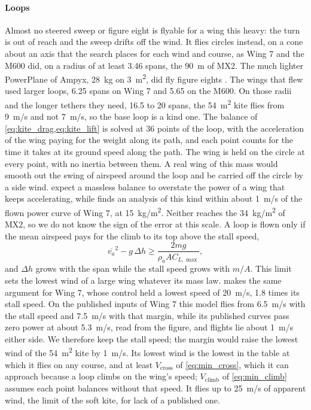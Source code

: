 \paragraph{Loops} Almost no steered sweep or figure eight is flyable for a wing this heavy: the turn is out of reach and the sweep drifts off the wind. It flies circles instead, on a cone about an axis that the search places for each wind and course, as Wing 7 and the M600 did, on a radius of at least 3.46 spans, the \SI{90}{m} of MX2. The much lighter PowerPlane of Ampyx, \SI{28}{kg} on \SI{3}{m^2}, did fly figure eights \citep{ruiterkamp2013}. The wings that flew used larger loops, 6.25 spans on Wing 7 \citep{vanderlind2013} and 5.65 on the M600. On those radii and the longer tethers they need, 16.5 to 20 spans, the \SI{54}{m^2} kite flies from \SI{9}{m/s} and not \SI{7}{m/s}, so the base loop is a kind one. The balance of \cref{eq:kite_drag,eq:kite_lift} is solved at 36 points of the loop, with the acceleration of the wing paying for the weight along its path, and each point counts for the time it takes at its ground speed along the path. The wing is held on the circle at every point, with no inertia between them. A real wing of this mass would smooth out the swing of airspeed around the loop and be carried off the circle by a side wind. \citet{ruiterkamp2013} expect a massless balance to overstate the power of a wing that keeps accelerating, while \citet{vanderlind2013} finds an analysis of this kind within about \SI{1}{m/s} of the flown power curve of Wing 7, at \SI{15}{kg/m^2}. Neither reaches the \SI{34}{kg/m^2} of MX2, so we do not know the sign of the error at this scale. A loop is flown only if the mean airspeed pays for the climb to its top above the stall speed,
\begin{equation}
\overline{v_a}^2 - g\,\Delta h \geq \frac{2mg}{\rho_a A C_{L,\max}},
\label{eq:loop_top}
\end{equation}
and $\Delta h$ grows with the span while the stall speed grows with $m/A$. This limit sets the lowest wind of a large wing whatever its mass law. \citet{vanderlind2013} makes the same argument for Wing 7, whose control held a lowest speed of \SI{20}{m/s}, 1.8 times its stall speed. On the published inputs of Wing 7 this model flies from \SI{6.5}{m/s} with the stall speed and \SI{7.5}{m/s} with that margin, while its published curves pass zero power at about \SI{5.3}{m/s}, read from the figure, and flights lie about \SI{1}{m/s} either side. We therefore keep the stall speed; the margin would raise the lowest wind of the \SI{54}{m^2} kite by \SI{1}{m/s}. Its lowest wind is the lowest in the table at which it flies on any course, and at least $V_\mathrm{cross}$ of \cref{eq:min_cross}, which it can approach because a loop climbs on the wing's speed; $V_\mathrm{climb}$ of \cref{eq:min_climb} assumes each point balances without that speed. It flies up to \SI{25}{m/s} of apparent wind, the limit of the soft kite, for lack of a published one.


